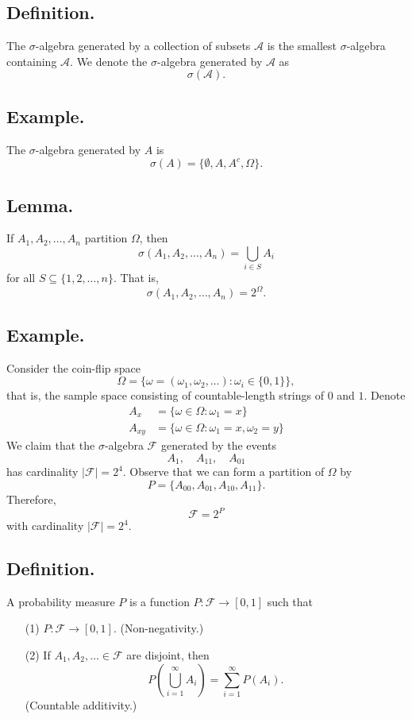 \documentclass[titlepage]{article}
\begin{document}
\subsection{Definition.} The $\sigma$-algebra generated by a collection of subsets $\mathcal{A}$ is the smallest $\sigma$-algebra containing $\mathcal{A}$. We denote the $\sigma$-algebra generated by $\mathcal{A}$ as
$$\sigma(\mathcal{A}).$$

\subsection{Example.} The $\sigma$-algebra generated by $A$ is 
$$\sigma(A) = \{\emptyset, A, A^{c}, \Omega\}.$$

\subsection{Lemma.} If $A_{1}, A_{2}, \ldots, A_{n}$ partition $\Omega$, then 
$$\sigma(A_{1}, A_{2}, \ldots, A_{n}) = \bigcup_{i \in S}A_{i}$$
for all $S \subseteq \{1, 2, \ldots, n\}$. That is, 
$$\sigma(A_{1}, A_{2}, \ldots, A_{n}) = 2^{\Omega}.$$

\subsection{Example.} Consider the coin-flip space 
$$\Omega = \{\omega = (\omega_{1}, \omega_{2}, \ldots): \omega_{i} \in \{0, 1\}\},$$
that is, the sample space consisting of countable-length strings of $0$ and $1$. Denote 
\begin{align*}
         A_{x} &= \{\omega \in \Omega: \omega_{1} = x\} \\
        A_{xy} &= \{\omega \in \Omega: \omega_{1} = x, \omega_{2} = y\}
\end{align*}
We claim that the $\sigma$-algebra $\mathcal{F}$ generated by the events 
$$A_{1}, \quad A_{11}, \quad A_{01}$$
has cardinality $|\mathcal{F}| = 2^{4}$. Observe that we can form a partition of $\Omega$ by 
$$P = \{A_{00}, A_{01}, A_{10}, A_{11}\}.$$
Therefore, 
$$\mathcal{F} = 2^{P}$$
with cardinality $|\mathcal{F}| = 2^{4}$.

\subsection{Definition.} A probability measure $P$ is a function $P: \mathcal{F} \to [0, 1]$ such that 
\begin{enumerate}
\item[(1)] $P: \mathcal{F} \to [0, 1]$. (Non-negativity.)
\item[(2)] If $A_{1}, A_{2}, \ldots \in \mathcal{F}$ are disjoint, then 
$$P\left(\bigcup_{i=1}^{\infty}A_{i}\right) = \sum_{i=1}^{\infty}P(A_{i}).$$
(Countable additivity.)
\end{enumerate}
\end{document}
